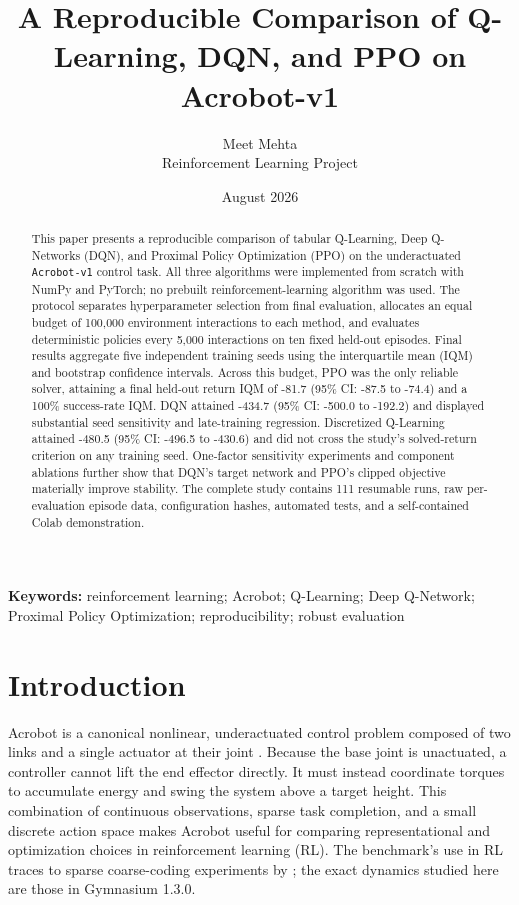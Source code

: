 \documentclass[11pt]{article}
\title{\vspace{-1.0cm}\textbf{A Reproducible Comparison of Q-Learning, DQN, and PPO on Acrobot-v1}}
\author{Meet Mehta\\\small Reinforcement Learning Project}
\date{August 2026}
\newcommand{\code}[1]{\texttt{#1}}
\begin{document}
\maketitle

\begin{abstract}
This paper presents a reproducible comparison of tabular Q-Learning, Deep
Q-Networks (DQN), and Proximal Policy Optimization (PPO) on the underactuated
\code{Acrobot-v1} control task. All three algorithms were implemented from
scratch with NumPy and PyTorch; no prebuilt reinforcement-learning algorithm was
used. The protocol separates hyperparameter selection from final evaluation,
allocates an equal budget of 100,000 environment interactions to each method,
and evaluates deterministic policies every 5,000 interactions on ten fixed
held-out episodes. Final results aggregate five independent training seeds using
the interquartile mean (IQM) and bootstrap confidence intervals. Across this
budget, PPO was the only reliable solver, attaining a final held-out return IQM
of -81.7 (95\% CI: -87.5 to -74.4) and a 100\% success-rate IQM. DQN attained
-434.7 (95\% CI: -500.0 to -192.2) and displayed substantial seed sensitivity
and late-training regression. Discretized Q-Learning attained -480.5 (95\% CI:
-496.5 to -430.6) and did not cross the study's solved-return criterion on any
training seed. One-factor sensitivity experiments and component ablations further
show that DQN's target network and PPO's clipped objective materially improve
stability. The complete study contains 111 resumable runs, raw per-evaluation
episode data, configuration hashes, automated tests, and a self-contained Colab
demonstration.
\end{abstract}

\textbf{Keywords:} reinforcement learning; Acrobot; Q-Learning; Deep Q-Network;
Proximal Policy Optimization; reproducibility; robust evaluation

\section{Introduction}

Acrobot is a canonical nonlinear, underactuated control problem composed of two
links and a single actuator at their joint \citep{spong1995acrobot}. Because the
base joint is unactuated, a controller cannot lift the end effector directly. It
must instead coordinate torques to accumulate energy and swing the system above
a target height. This combination of continuous observations, sparse task
completion, and a small discrete action space makes Acrobot useful for comparing
representational and optimization choices in reinforcement learning (RL). The
benchmark's use in RL traces to sparse coarse-coding experiments by
\citet{sutton1995generalization}; the exact dynamics studied here are those in
Gymnasium 1.3.0.
\end{document}
